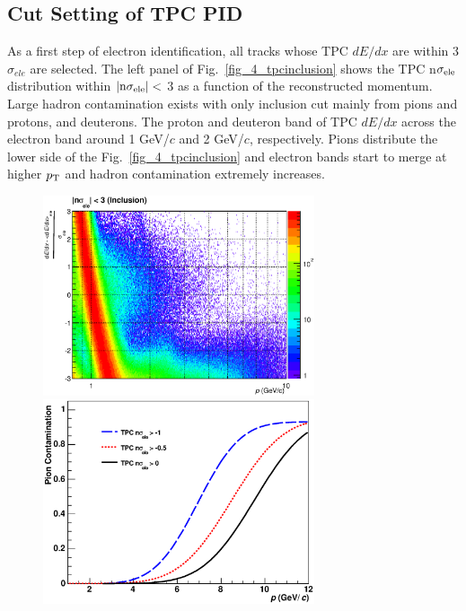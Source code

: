 {\subsection{Cut Setting of TPC PID}
\label{sec_4_cutset}
As a first step of electron identification, all tracks whose TPC $dE/dx$ are within 3$\sigma_{ele}$ are selected. 
The left panel of Fig.~\ref{fig_4_tpcinclusion} shows the TPC n$\sigma_{\rm{ele}}$ distribution within $|\rm{n}\sigma_{\rm{ele}}|<$ 3 as a function of the reconstructed momentum. 
Large hadron contamination exists with only inclusion cut mainly from pions and protons, and deuterons. 
The proton and deuteron band of TPC $dE/dx$ across the electron band around 1 GeV/$c$ and 2 GeV/$c$, respectively.  
Pions distribute the lower side of the Fig.~\ref{fig_4_tpcinclusion} and electron bands start to merge at higher $p_{\rm{T}}$ and hadron contamination extremely increases.   
\begin{figure}[!h]
 \begin{minipage}{0.5\hsize}
  \begin{center}
  \includegraphics[width=8cm]{chap4/figure/PID/TPCNSigma_AfterInclusion_MB.eps}
  \end{center}
 \end{minipage}
 \begin{minipage}{0.5\hsize}
  \begin{center}
    \includegraphics[width=8cm]{chap4/figure/PID/PionContami_MB.eps}

\end{center}
\end{minipage}
\end{figure}}
